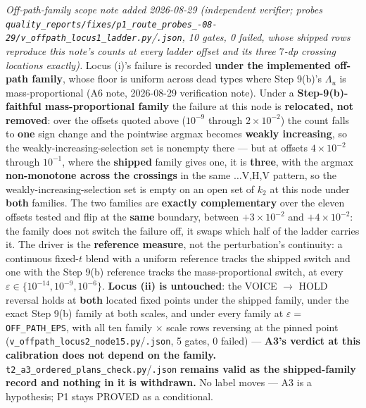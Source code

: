 \documentclass[11pt,a4paper]{article}
\begin{document}
\begin{description}[leftmargin=1.9em,style=unboxed]
  \emph{Off-path-family scope note added 2026-08-29 (independent verifier; probes
  \texttt{quality\_reports/\allowbreak fixes/\allowbreak p1\_route\_probes\_-08-29/\allowbreak v\_offpath\_\allowbreak locus1\_ladder.py}/\texttt{.json},
  10 gates, 0 failed, whose shipped rows reproduce this note's counts at every ladder offset
  and its three $7$-dp crossing locations exactly).} Locus (i)'s failure is recorded
  \textbf{under the implemented off-path family}, whose floor is uniform across dead types
  where Step 9(b)'s $\Lambda_u$ is mass-proportional (A6 note, 2026-08-29 verification note).
  Under a \textbf{Step-9(b)-faithful mass-proportional family} the failure at this node is
  \textbf{relocated, not removed}: over the offsets quoted above ($10^{-9}$ through
  $2\times10^{-2}$) the count falls to \textbf{one} sign change and the pointwise argmax
  becomes \textbf{weakly increasing}, so the weakly-increasing-selection set is nonempty there
  --- but at offsets $4\times10^{-2}$ through $10^{-1}$, where the \textbf{shipped} family
  gives one, it is \textbf{three}, with the argmax \textbf{non-monotone across the crossings}
  in the same $\ldots$V,H,V pattern, so the weakly-increasing-selection set is empty on an
  open set of $k_2$ at this node under \textbf{both} families. The two families are
  \textbf{exactly complementary} over the eleven offsets tested and flip at the \textbf{same}
  boundary, between $+3\times10^{-2}$ and $+4\times10^{-2}$: the family does not switch the
  failure off, it swaps which half of the ladder carries it. The driver is the
  \textbf{reference measure}, not the perturbation's continuity: a continuous fixed-$t$ blend
  with a uniform reference tracks the shipped switch and one with the Step 9(b) reference
  tracks the mass-proportional switch, at every
  $\varepsilon\in\{10^{-14},10^{-9},10^{-6}\}$. \textbf{Locus (ii) is untouched}: the VOICE
  $\to$ HOLD reversal holds at \textbf{both} located fixed points under the shipped family,
  under the exact Step 9(b) family at both scales, and under every family at $\varepsilon=$
  \texttt{OFF\_PATH\_EPS}, with all ten family $\times$ scale rows reversing at the pinned
  point (\texttt{v\_offpath\_locus2\_node15.py}/\texttt{.json}, 5 gates, 0 failed) ---
  \textbf{A3's verdict at this calibration does not depend on the family.}
  \texttt{t2\_a3\_ordered\_plans\_check.py}/\texttt{.json} \textbf{remains valid as the
  shipped-family record and nothing in it is withdrawn.} No label moves --- A3 is a
  hypothesis; P1 stays PROVED as a conditional.


\end{description}
\end{document}
